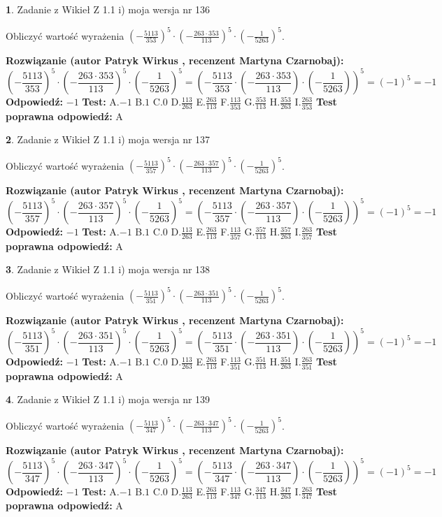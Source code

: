 \documentclass[12pt, a4paper]{article}
\theoremstyle{definition} %
\newtheorem{zad}{}
\newcommand{\zadStart}[1]{\begin{zad}#1\newline}
\newcommand{\zadStop}{\end{zad}}
\newcommand{\rozwStart}[2]{\noindent \textbf{Rozwiązanie (autor #1 , recenzent #2): }\newline}
\newcommand{\rozwStop}{\newline}
\newcommand{\odpStart}{\noindent \textbf{Odpowiedź:}\newline}
\newcommand{\odpStop}{\newline}
\newcommand{\testStart}{\noindent \textbf{Test:}\newline}
\newcommand{\testStop}{\newline}
\newcommand{\kluczStart}{\noindent \textbf{Test poprawna odpowiedź:}\newline}
\newcommand{\kluczStop}{\newline}
\begin{document}
\zadStart{Zadanie z Wikieł Z 1.1 i) moja wersja nr 136}

Obliczyć wartość wyrażenia $(-\frac{5113}{353})^{5} \cdot (-\frac{263 \cdot 353}{113})^{5} \cdot (-\frac{1}{5263})^{5}$.
\zadStop
\rozwStart{Patryk Wirkus}{Martyna Czarnobaj}
$$(-\frac{5113}{353})^{5} \cdot (-\frac{263 \cdot 353}{113})^{5} \cdot (-\frac{1}{5263})^{5} = (-\frac{5113}{353} \cdot (-\frac{263 \cdot 353}{113}) \cdot (-\frac{1}{5263}))^{5} = (-1)^{5} = -1$$
\rozwStop
\odpStart
$-1$
\odpStop
\testStart
A.$-1$ B.$1$ C.$0$ D.$\frac{113}{263}$ E.$\frac{263}{113}$
F.$\frac{113}{353}$ G.$\frac{353}{113}$
H.$\frac{353}{263}$
I.$\frac{263}{353}$
\testStop
\kluczStart
A
\kluczStop



\zadStart{Zadanie z Wikieł Z 1.1 i) moja wersja nr 137}

Obliczyć wartość wyrażenia $(-\frac{5113}{357})^{5} \cdot (-\frac{263 \cdot 357}{113})^{5} \cdot (-\frac{1}{5263})^{5}$.
\zadStop
\rozwStart{Patryk Wirkus}{Martyna Czarnobaj}
$$(-\frac{5113}{357})^{5} \cdot (-\frac{263 \cdot 357}{113})^{5} \cdot (-\frac{1}{5263})^{5} = (-\frac{5113}{357} \cdot (-\frac{263 \cdot 357}{113}) \cdot (-\frac{1}{5263}))^{5} = (-1)^{5} = -1$$
\rozwStop
\odpStart
$-1$
\odpStop
\testStart
A.$-1$ B.$1$ C.$0$ D.$\frac{113}{263}$ E.$\frac{263}{113}$
F.$\frac{113}{357}$ G.$\frac{357}{113}$
H.$\frac{357}{263}$
I.$\frac{263}{357}$
\testStop
\kluczStart
A
\kluczStop



\zadStart{Zadanie z Wikieł Z 1.1 i) moja wersja nr 138}

Obliczyć wartość wyrażenia $(-\frac{5113}{351})^{5} \cdot (-\frac{263 \cdot 351}{113})^{5} \cdot (-\frac{1}{5263})^{5}$.
\zadStop
\rozwStart{Patryk Wirkus}{Martyna Czarnobaj}
$$(-\frac{5113}{351})^{5} \cdot (-\frac{263 \cdot 351}{113})^{5} \cdot (-\frac{1}{5263})^{5} = (-\frac{5113}{351} \cdot (-\frac{263 \cdot 351}{113}) \cdot (-\frac{1}{5263}))^{5} = (-1)^{5} = -1$$
\rozwStop
\odpStart
$-1$
\odpStop
\testStart
A.$-1$ B.$1$ C.$0$ D.$\frac{113}{263}$ E.$\frac{263}{113}$
F.$\frac{113}{351}$ G.$\frac{351}{113}$
H.$\frac{351}{263}$
I.$\frac{263}{351}$
\testStop
\kluczStart
A
\kluczStop



\zadStart{Zadanie z Wikieł Z 1.1 i) moja wersja nr 139}

Obliczyć wartość wyrażenia $(-\frac{5113}{347})^{5} \cdot (-\frac{263 \cdot 347}{113})^{5} \cdot (-\frac{1}{5263})^{5}$.
\zadStop
\rozwStart{Patryk Wirkus}{Martyna Czarnobaj}
$$(-\frac{5113}{347})^{5} \cdot (-\frac{263 \cdot 347}{113})^{5} \cdot (-\frac{1}{5263})^{5} = (-\frac{5113}{347} \cdot (-\frac{263 \cdot 347}{113}) \cdot (-\frac{1}{5263}))^{5} = (-1)^{5} = -1$$
\rozwStop
\odpStart
$-1$
\odpStop
\testStart
A.$-1$ B.$1$ C.$0$ D.$\frac{113}{263}$ E.$\frac{263}{113}$
F.$\frac{113}{347}$ G.$\frac{347}{113}$
H.$\frac{347}{263}$
I.$\frac{263}{347}$
\testStop
\kluczStart
A
\kluczStop
\end{document}
